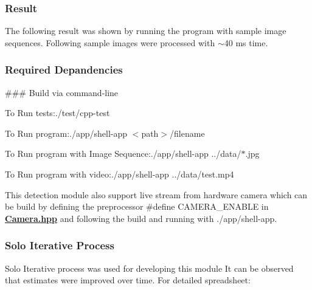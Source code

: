 \subsubsection*{Result}

The following result was shown by running the program with sample image sequences. Following sample images were processed with $\sim$40 ms time. 





 \subsubsection*{Required Depandencies}

\href{https://docs.opencv.org/trunk/d7/d9f/tutorial_linux_install.html}{\tt }

\#\#\# Build via command-\/line 

\begin{DoxyItemize}
\item To Run tests\+:{\ttfamily ./test/cpp-\/test}
\item To Run program\+:{\ttfamily ./app/shell-\/app $<$path$>$/filename}
\item To Run program with Image Sequence\+:{\ttfamily ./app/shell-\/app ../data/$\ast$.jpg}
\item To Run program with video\+:{\ttfamily ./app/shell-\/app ../data/test.mp4}
\end{DoxyItemize}

This detection module also support live stream from hardware camera which can be build by defining the preprocessor {\ttfamily \#define C\+A\+M\+E\+R\+A\+\_\+\+E\+N\+A\+B\+LE} in {\bfseries \hyperlink{_camera_8hpp}{Camera.\+hpp}} and following the build and running with {\ttfamily ./app/shell-\/app}. 

 \subsubsection*{Solo Iterative Process}

Solo Iterative process was used for developing this module It can be observed that estimates were improved over time. For detailed spreadsheet\+: \href{https://docs.google.com/spreadsheets/d/1QMfyDhY2k-3UoVmqBBLPma-o_mvVv3tEnGuCV8GbJtA/edit?usp=sharing}{\tt } 

 